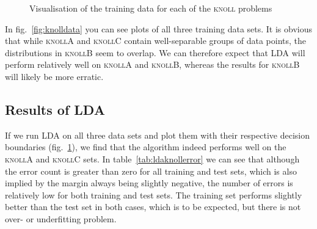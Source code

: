 \documentclass{article}
\newcommand{\knollA}{\textsc{knollA}\xspace}
\newcommand{\knollB}{\textsc{knollB}\xspace}
\newcommand{\knollC}{\textsc{knollC}\xspace}
\begin{document}
\begin{figure}

  \caption{Visualisation of the training data for each of the \textsc{knoll} problems}
  \label{fig:ldaknollplots}
\end{figure}

In fig.~\ref{fig:knolldata} you can see plots of all three training data sets. It is obvious
that while \knollA and \knollC contain well-separable groups of data points, the distributions in \knollB
seem to overlap. We can therefore expect that LDA will perform relatively well on \knollA and \knollB, whereas
the results for \knollB will likely be more erratic. 

\subsection{Results of LDA}
If we run LDA on all three data sets and plot them with their respective decision boundaries (fig.~\ref{fig:ldaknollplots}), we find 
that the algorithm indeed performs well on the \knollA and \knollC sets. In table~\ref{tab:ldaknollerror} we can see that although the error count is greater than zero for all 
training and test sets, which is also implied by the margin always being slightly negative, the number of errors
is relatively low for both training and test sets. The training set performs slightly better than the test set in both 
cases, which is to be expected, but there is not over- or underfitting problem.
\end{document}
